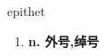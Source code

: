 
\begin{frame}
{\huge epithet}
\begin{center}
\begin{enumerate}\Large
  \item \textbf{n. 外号,绰号}
\end{enumerate}
\end{center}
\end{frame}
